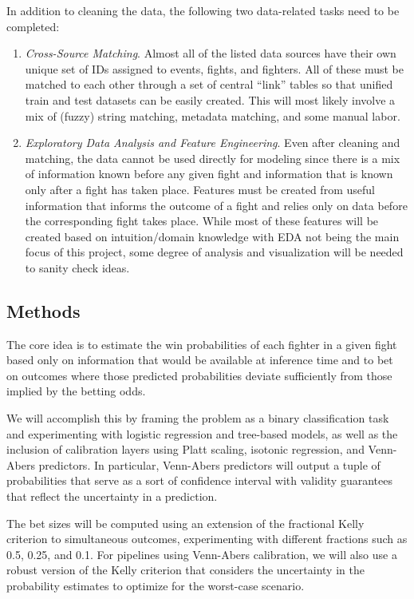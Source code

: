 \documentclass[
  letterpaper,
  DIV=11,
  numbers=noendperiod]{scrartcl}
\begin{document}
In addition to cleaning the data, the following two data-related tasks need to be completed:
\begin{enumerate}
    \item \textit{Cross-Source Matching}. Almost all of the listed data sources have their own unique set of IDs assigned to events, fights, and fighters. All of these must be matched to each other through a set of central ``link'' tables so that unified train and test datasets can be easily created. This will most likely involve a mix of (fuzzy) string matching, metadata matching, and some manual labor.
    \item \textit{Exploratory Data Analysis and Feature Engineering}. Even after cleaning and matching, the data cannot be used directly for modeling since there is a mix of information known before any given fight and information that is known only after a fight has taken place. Features must be created from useful information that informs the outcome of a fight and relies only on data before the corresponding fight takes place. While most of these features will be created based on intuition/domain knowledge with EDA not being the main focus of this project, some degree of analysis and visualization will be needed to sanity check ideas.
\end{enumerate}


\subsection{Methods}\label{methods}

The core idea is to estimate the win probabilities of each fighter in a given fight based only on information that would be available at inference time and to bet on outcomes where those predicted probabilities deviate sufficiently from those implied by the betting odds.

We will accomplish this by framing the problem as a binary classification task and experimenting with logistic regression and tree-based models, as well as the inclusion of calibration layers using Platt scaling, isotonic regression, and Venn-Abers predictors. In particular, Venn-Abers predictors will output a tuple of probabilities that serve as a sort of confidence interval with validity guarantees that reflect the uncertainty in a prediction.

The bet sizes will be computed using an extension of the fractional Kelly criterion to simultaneous outcomes, experimenting with different fractions such as 0.5, 0.25, and 0.1. For pipelines using Venn-Abers calibration, we will also use a robust version of the Kelly criterion that considers the uncertainty in the probability estimates to optimize for the worst-case scenario.
\end{document}
